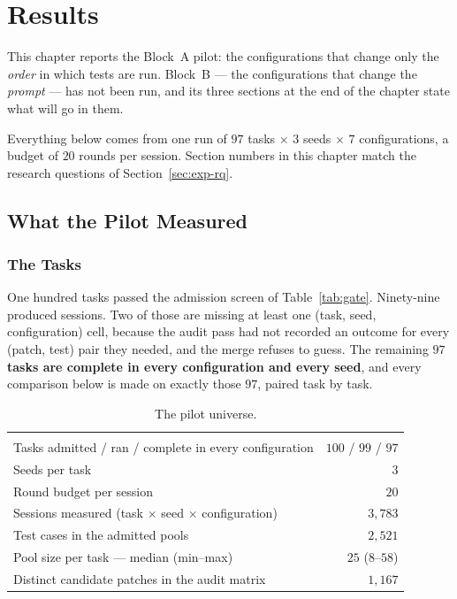 \chapter{Results}
\label{ch:results}

This chapter reports the Block~A pilot: the configurations that change only the
\emph{order} in which tests are run. Block~B --- the configurations that change
the \emph{prompt} --- has not been run, and its three sections at the end of
the chapter state what will go in them.

Everything below comes from one run of $97$ tasks $\times$ $3$ seeds $\times$
$7$ configurations, a budget of $20$ rounds per session. Section numbers in
this chapter match the research questions of
Section~\ref{sec:exp-rq}.

\section{What the Pilot Measured}
\label{sec:res-corpus}

\subsection{The Tasks}

One hundred tasks passed the admission screen of
Table~\ref{tab:gate}. Ninety-nine produced sessions. Two of those are missing
at least one (task, seed, configuration) cell, because the audit pass had not
recorded an outcome for every (patch, test) pair they needed, and the merge
refuses to guess. The remaining \textbf{$97$ tasks are complete in every
configuration and every seed}, and every comparison below is made on exactly
those $97$, paired task by task.

\begin{table}[htbp]
\centering
\caption{The pilot universe.}
\label{tab:res-universe}
\small
\begin{tabularx}{\textwidth}{@{}X r@{}}
\toprule
 & \\[-8pt]
Tasks admitted / ran / complete in every configuration & $100$ / $99$ / $97$\\
Seeds per task & $3$\\
Round budget per session & $20$\\
Sessions measured (task $\times$ seed $\times$ configuration) & $3{,}783$\\
Test cases in the admitted pools & $2{,}521$\\
Pool size per task --- median (min--max) & $25$ ($8$--$58$)\\
Distinct candidate patches in the audit matrix & $1{,}167$\\
\bottomrule
\end{tabularx}
\end{table}

